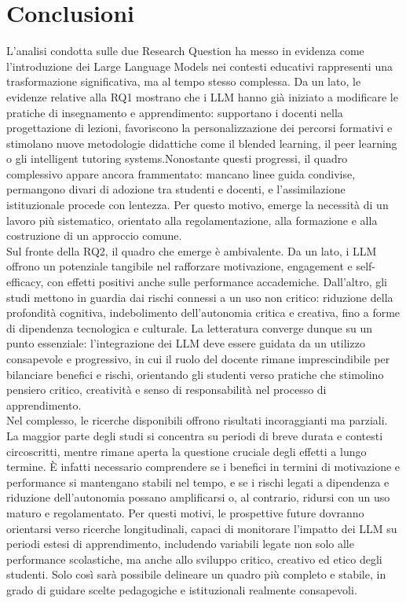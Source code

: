 \documentclass[a4paper,9pt]{article}
\begin{document}
\section{Conclusioni}

L’analisi condotta sulle due Research Question ha messo in evidenza come l’introduzione dei Large Language Models nei contesti educativi rappresenti una trasformazione significativa, ma al tempo stesso complessa. Da un lato, le evidenze relative alla RQ1 mostrano che i LLM hanno già iniziato a modificare le pratiche di insegnamento e apprendimento: supportano i docenti nella progettazione di lezioni, favoriscono la personalizzazione dei percorsi formativi e stimolano nuove metodologie didattiche come il blended learning, il peer learning o gli intelligent tutoring systems.Nonostante questi progressi, il quadro complessivo appare ancora frammentato: mancano linee guida condivise, permangono divari di adozione tra studenti e docenti, e l’assimilazione istituzionale procede con lentezza. Per questo motivo, emerge la necessità di un lavoro più sistematico, orientato alla regolamentazione, alla formazione e alla costruzione di un approccio comune.\\
Sul fronte della RQ2, il quadro che emerge è ambivalente. Da un lato, i LLM offrono un potenziale tangibile nel rafforzare motivazione, engagement e self-efficacy, con effetti positivi anche sulle performance accademiche. Dall’altro, gli studi mettono in guardia dai rischi connessi a un uso non critico: riduzione della profondità cognitiva, indebolimento dell’autonomia critica e creativa, fino a forme di dipendenza tecnologica e culturale. La letteratura converge dunque su un punto essenziale: l’integrazione dei LLM deve essere guidata da un utilizzo consapevole e progressivo, in cui il ruolo del docente rimane imprescindibile per bilanciare benefici e rischi, orientando gli studenti verso pratiche che stimolino pensiero critico, creatività e senso di responsabilità nel processo di apprendimento.\\
Nel complesso, le ricerche disponibili offrono risultati incoraggianti ma parziali. La maggior parte degli studi si concentra su periodi di breve durata e contesti circoscritti, mentre rimane aperta la questione cruciale degli effetti a lungo termine. È infatti necessario comprendere se i benefici in termini di motivazione e performance si mantengano stabili nel tempo, e se i rischi legati a dipendenza e riduzione dell’autonomia possano amplificarsi o, al contrario, ridursi con un uso maturo e regolamentato. Per questi motivi, le prospettive future dovranno orientarsi verso ricerche longitudinali, capaci di monitorare l’impatto dei LLM su periodi estesi di apprendimento, includendo variabili legate non solo alle performance scolastiche, ma anche allo sviluppo critico, creativo ed etico degli studenti. Solo così sarà possibile delineare un quadro più completo e stabile, in grado di guidare scelte pedagogiche e istituzionali realmente consapevoli.
\newpage
\end{document}
